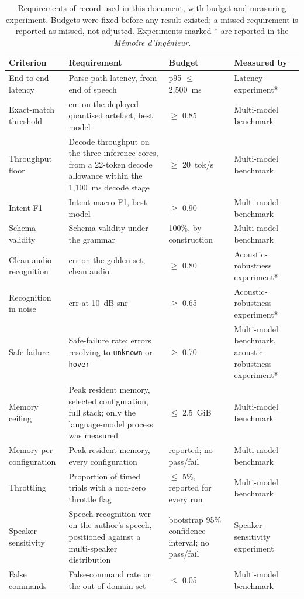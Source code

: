 \begin{table}[htbp]
\centering
\footnotesize
\caption[Requirements of record]{Requirements of record used in this document, with budget and measuring experiment.
Budgets were fixed before any result existed; a missed requirement is reported as missed, not
adjusted. Experiments marked * are reported in the \emph{M\'emoire d'Ing\'enieur}.}
\label{tab:requirements}
\begin{tabularx}{\textwidth}{@{}>{\raggedright\arraybackslash}p{2.3cm} X l >{\raggedright\arraybackslash}p{2.6cm}@{}}
\toprule
Criterion & Requirement & Budget & Measured by \\
\midrule
End-to-end latency & Parse-path latency, from end of speech & p95 $\leq$ 2{,}500~ms & Latency experiment* \\
Exact-match threshold & \acrshort{em} on the deployed quantised artefact, best model & $\geq$ 0.85 & Multi-model benchmark \\
Throughput floor & Decode throughput on the three inference cores, from a 22-token decode allowance within the 1{,}100~ms decode stage & $\geq$ 20~tok/s & Multi-model benchmark \\
Intent F1 & Intent macro-F1, best model & $\geq$ 0.90 & Multi-model benchmark \\
Schema validity & Schema validity under the grammar & 100\%, by construction & Multi-model benchmark \\
Clean-audio recognition & \acrshort{crr} on the golden set, clean audio & $\geq$ 0.80 & Acoustic-robustness experiment* \\
Recognition in noise & \acrshort{crr} at 10~dB \acrshort{snr} & $\geq$ 0.65 & Acoustic-robustness experiment* \\
Safe failure & Safe-failure rate: errors resolving to \texttt{unknown} or \texttt{hover} & $\geq$ 0.70 & Multi-model benchmark, acoustic-robustness experiment* \\
Memory ceiling & Peak resident memory, selected configuration, full stack; only the language-model process was measured & $\leq$ 2.5~GiB & Multi-model benchmark \\
Memory per configuration & Peak resident memory, every configuration & reported; no pass/fail & Multi-model benchmark \\
Throttling & Proportion of timed trials with a non-zero throttle flag & $\leq$ 5\%, reported for every run & Multi-model benchmark \\
Speaker sensitivity & Speech-recognition \acrshort{wer} on the author's speech, positioned against a multi-speaker distribution & bootstrap 95\% confidence interval; no pass/fail & Speaker-sensitivity experiment \\
False commands & False-command rate on the out-of-domain set & $\leq$ 0.05 & Multi-model benchmark \\
\bottomrule
\end{tabularx}
\end{table}

